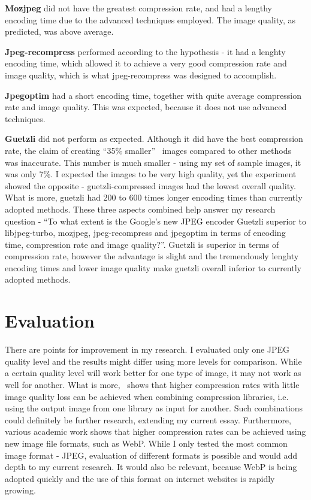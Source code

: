 \documentclass[12pt]{article}
\newcommand{\researchQuestion}{``To what extent is the Google's new JPEG encoder Guetzli superior to libjpeg-turbo, mozjpeg, jpeg-recompress and jpegoptim in terms of encoding time, compression rate and image quality?''}
\begin{document}
\textbf{Mozjpeg} did not have the greatest compression rate, and had a lengthy encoding time due to the advanced techniques employed. The image quality, as predicted, was above average.

\textbf{Jpeg-recompress} performed according to the hypothesis - it had a lenghty encoding time, which allowed it to achieve a very good compression rate and image quality, which is what jpeg-recompress was designed to accomplish.

\textbf{Jpegoptim} had a short encoding time, together with quite average compression rate and image quality. This was expected, because it does not use advanced techniques.

\textbf{Guetzli} did not perform as expected. Although it did have the best compression rate, the claim of creating ``35\% smaller''~\cite{guetzli} images compared to other methods was inaccurate. This number is much smaller - using my set of sample images, it was only 7\%. I expected the images to be very high quality, yet the experiment showed the opposite - guetzli-compressed images had the lowest overall quality. What is more, guetzli had 200 to 600 times longer encoding times than currently adopted methods. These three aspects combined help answer my research question - \researchQuestion. Guetzli is superior in terms of compression rate, however the advantage is slight and the tremendously lenghty encoding times and lower image quality make guetzli overall inferior to currently adopted methods.
\clearpage
\section{Evaluation}
There are points for improvement in my research. I evaluated only one JPEG quality level and the results might differ using more levels for comparison. While a certain quality level will work better for one type of image, it may not work as well for another. What is more,~\cite{mixing} shows that higher compression rates with little image quality loss can be achieved when combining compression libraries, i.e. using the output image from one library as input for another. Such combinations could definitely be further research, extending my current essay. Furthermore, various academic work shows that higher compression rates can be achieved using new image file formats, such as WebP. While I only tested the most common image format - JPEG, evaluation of different formats is possible and would add depth to my current research. It would also be relevant, because WebP is being adopted quickly and the use of this format on internet websites is rapidly growing.
\end{document}
